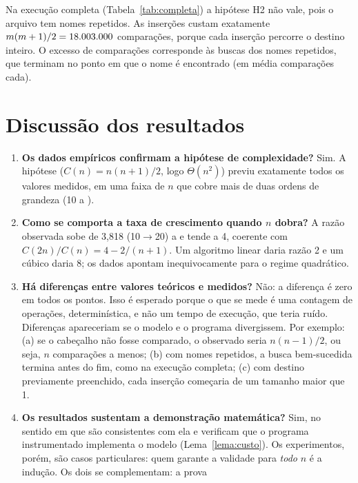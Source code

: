 \documentclass[11pt,a4paper]{article}
\begin{document}
Na execução completa (Tabela~\ref{tab:completa}) a hipótese H2 não vale, pois o
arquivo tem \cRedundantes{} nomes repetidos. As \cInseridos{} inserções custam
exatamente $m(m+1)/2=18.003.000{}$ comparações, porque cada inserção percorre o
destino inteiro. O excesso de \cExcesso{} comparações corresponde às buscas dos
nomes repetidos, que terminam no ponto em que o nome é encontrado (em média
\cMedia{} comparações cada).

\section{Discussão dos resultados}

\begin{enumerate}[label=\textbf{\arabic*.}]
  \item \textbf{Os dados empíricos confirmam a hipótese de complexidade?} Sim. A
        hipótese ($C(n)=n(n+1)/2$, logo $\Theta(n^2)$) previu exatamente todos
        os \totalpontos{} valores medidos, em uma faixa de $n$ que cobre mais de duas ordens de
        grandeza (10 a \maiorN).
  \item \textbf{Como se comporta a taxa de crescimento quando $n$ dobra?} A
        razão observada sobe de 3,818 (10$\to$20) a \razaoMaior{} e tende a 4,
        coerente com $C(2n)/C(n)=4-2/(n+1)$. Um algoritmo linear daria razão 2 e
        um cúbico daria 8; os dados apontam inequivocamente para o regime
        quadrático.
  \item \textbf{Há diferenças entre valores teóricos e medidos?} Não: a
        diferença é zero em todos os pontos. Isso é esperado porque o que se mede
        é uma contagem de operações, determinística, e não um tempo de
        execução, que teria ruído. Diferenças apareceriam se o modelo e o
        programa divergissem. Por exemplo: (a) se o cabeçalho não fosse comparado, o
        observado seria $n(n-1)/2$, ou seja, $n$ comparações a menos; (b) com nomes
        repetidos, a busca bem-sucedida termina antes do fim, como na execução
        completa; (c) com destino previamente preenchido, cada inserção
        começaria de um tamanho maior que 1.
  \item \textbf{Os resultados sustentam a demonstração matemática?} Sim, no
        sentido em que são consistentes com ela e verificam que o programa
        instrumentado implementa o modelo (Lema~\ref{lema:custo}). Os
        experimentos, porém, são casos particulares: quem garante a validade
        para \emph{todo} $n$ é a indução. Os dois se complementam: a prova

\end{enumerate}
\end{document}
